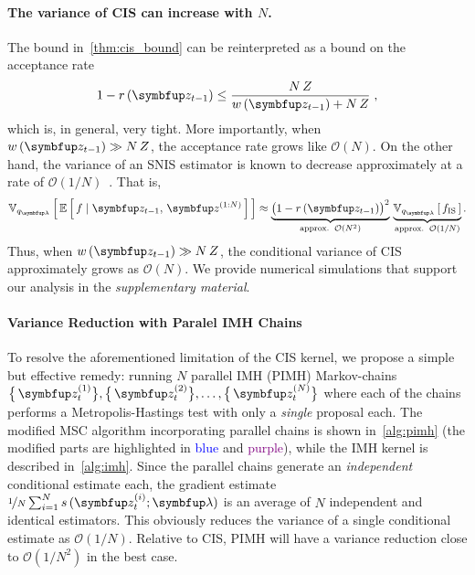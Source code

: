 \paragraph{The variance of CIS can increase with \(N\).}
The bound in~\cref{thm:cis_bound} can be reinterpreted as a bound on the acceptance rate 
\begin{align}
  1 - r\,(\vz_{t-1}) \leq \frac{N\,Z}{ w\,(\vz_{t-1}) + N\,Z}\;,
\end{align}
which is, in general, very tight.
More importantly, when \(w\,(\vz_{t-1}) \gg N\,Z\), the acceptance rate grows like \(\mathcal{O}(N)\).
On the other hand, the variance of an SNIS estimator is known to decrease approximately at a rate of \(\mathcal{O}(1/N)\)~\citep{kong_sequential_1994, robert_monte_2004, elvira_rethinking_2018}.
That is, 
\begin{align}
  \Vsub{q_{\vlambda}}{ \E{ f \mid \vz_{t-1},\,\vz^{(1:N)} } } \approx \underbrace{{\big(1 - r\,(\vz_{t-1})\big)}^2}_{\text{approx.}\;\;\mathcal{O}(N^2)} \,
  \underbrace{\Vsub{q_{\vlambda}}{ f_{\text{IS}} }}_{\text{approx.}\;\;\mathcal{O}(1/N)}.\label{eq:cis_variance_incr}
\end{align}
Thus, when \(w\,(\vz_{t-1})\gg N\,Z\), the conditional variance of CIS approximately grows as \(\mathcal{O}(N)\).
We provide numerical simulations that support our analysis in the \textit{supplementary material}.

\vspace{-0.02in}


\vspace{-0.1in}
\paragraph{Variance Reduction with Paralel IMH Chains}
To resolve the aforementioned limitation of the CIS kernel, we propose a simple but effective remedy: running \(N\) parallel IMH (PIMH) Markov-chains \( \big\{\,\vz_t^{(1)}\big\}, \big\{\,\vz_t^{(2)}\big\}, \ldots, \big\{\,\vz_t^{(N)}\big\}\) where each of the chains performs a Metropolis-Hastings test with only a \textit{single} proposal each.
The modified MSC algorithm incorporating parallel chains is shown in~\cref{alg:pimh} (the modified parts are highlighted in \textcolor{blue}{blue} and \textcolor{purple}{purple}), while the IMH kernel is described in~\cref{alg:imh}.
Since the parallel chains generate an \textit{independent} conditional estimate each, the gradient estimate \(\nicefrac{1}{N} \sum^{N}_{i=1} s\,(\vz_t^{(i)}; \vlambda)\) is an average of \(N\) independent and identical estimators.
This obviously reduces the variance of a single conditional estimate as \(\mathcal{O}(1/N)\).
Relative to CIS, PIMH will have a variance reduction close to \(\mathcal{O}(1/N^2)\) in the best case.
%
%

